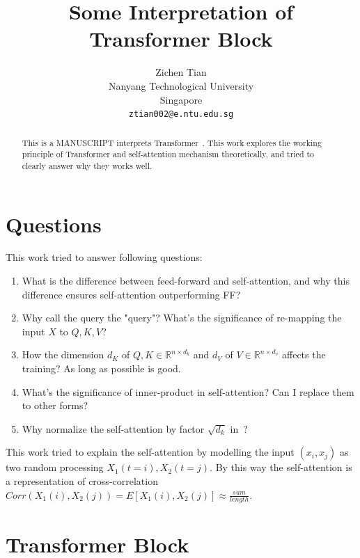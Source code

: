 \documentclass[final]{cvpr}
\begin{document}
\title{Some Interpretation of Transformer Block}

\author{Zichen Tian\\
Nanyang Technological University\\
Singapore\\
{\tt\small ztian002@e.ntu.edu.sg}
}

\maketitle


\begin{abstract}
This is a MANUSCRIPT interprets Transformer~\cite{vaswani2017attention}. This work explores the working principle of Transformer and self-attention mechanism theoretically, and tried to clearly answer why they works well. 
\end{abstract}

\section{Questions}
This work tried to answer following questions: 
\begin{enumerate}
    \item What is the difference between feed-forward and self-attention, and why this difference ensures self-attention outperforming FF? 
    \item Why call the query the "query"? What's the significance of re-mapping the input $X$ to $Q,K,V$? 
    \item How the dimension $d_K$ of $Q,K\in{\mathbb{R}^{n\times{d_k}}}$ and $d_V$ of $V\in{\mathbb{R}^{n\times{d_v}}}$ affects the training? As long as possible is good.
    \item What's the significance of inner-product in self-attention? Can I replace them to other forms? 
    \item Why normalize the self-attention by factor $\sqrt{d_k}$ in~\cite{vaswani2017attention}?
\end{enumerate}

This work tried to explain the self-attention by modelling the input $(x_i, x_j)$ as two random processing $X_1(t=i), X_2(t=j)$. By this way the self-attention is a representation of cross-correlation $Corr(X_1(i), X_2(j))=E[X_1(i),X_2(j)]\approx\frac{sum}{length}$.
\section{Transformer Block}
\end{document}
